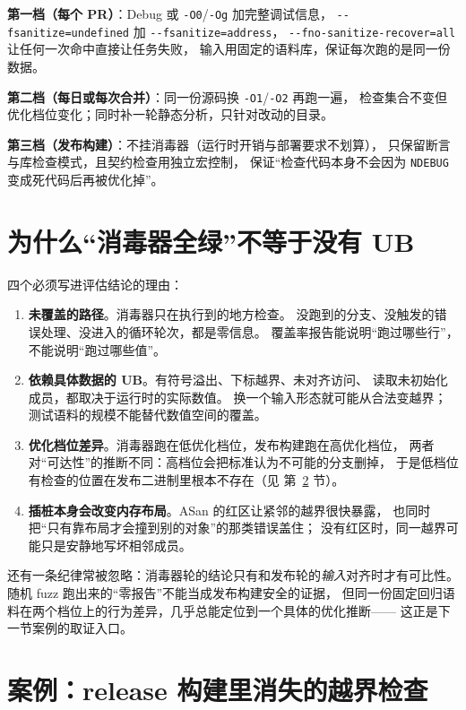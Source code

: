 \documentclass[12pt,a4paper,fontset=fandol]{ctexbook}
\newcommand{\Tp}[1]{\texttt{#1}}
\newcommand{\Opt}[1]{\texttt{-\/-#1}}
\begin{document}
\begin{guideline}[title={分档策略：按档位决定检查集合}]
\textbf{第一档（每个 PR）}：Debug 或 \Tp{-O0}/\Tp{-Og} 加完整调试信息，
\Opt{fsanitize=undefined} 加 \Opt{fsanitize=address}，
\Opt{fno-sanitize-recover=all} 让任何一次命中直接让任务失败，
输入用固定的语料库，保证每次跑的是同一份数据。

\textbf{第二档（每日或每次合并）}：同一份源码换 \Tp{-O1}/\Tp{-O2} 再跑一遍，
检查集合不变但优化档位变化；同时补一轮静态分析，只针对改动的目录。

\textbf{第三档（发布构建）}：不挂消毒器（运行时开销与部署要求不划算），
只保留断言与库检查模式，且契约检查用独立宏控制，
保证“检查代码本身不会因为 \Tp{NDEBUG} 变成死代码后再被优化掉”。
\end{guideline}

\section{为什么“消毒器全绿”不等于没有 UB}\label{sec:ub03-green}

四个必须写进评估结论的理由：

\begin{enumerate}
\item \textbf{未覆盖的路径}。消毒器只在执行到的地方检查。
      没跑到的分支、没触发的错误处理、没进入的循环轮次，都是零信息。
      覆盖率报告能说明“跑过哪些行”，不能说明“跑过哪些值”。
\item \textbf{依赖具体数据的 UB}。有符号溢出、下标越界、未对齐访问、
      读取未初始化成员，都取决于运行时的实际数值。
      换一个输入形态就可能从合法变越界；测试语料的规模不能替代数值空间的覆盖。
\item \textbf{优化档位差异}。消毒器跑在低优化档位，发布构建跑在高优化档位，
      两者对“可达性”的推断不同：高档位会把标准认为不可能的分支删掉，
      于是低档位有检查的位置在发布二进制里根本不存在（见 第~\ref{sec:ub03-case-checkdrop} 节）。
\item \textbf{插桩本身会改变内存布局}。ASan 的红区让紧邻的越界很快暴露，
      也同时把“只有靠布局才会撞到别的对象”的那类错误盖住；
      没有红区时，同一越界可能只是安静地写坏相邻成员。
\end{enumerate}

还有一条纪律常被忽略：消毒器轮的结论只有和发布轮的\emph{输入}对齐时才有可比性。
随机 fuzz 跑出来的“零报告”不能当成发布构建安全的证据，
但同一份固定回归语料在两个档位上的行为差异，几乎总能定位到一个具体的优化推断——
这正是下一节案例的取证入口。

\section{案例：release 构建里消失的越界检查}\label{sec:ub03-case-checkdrop}
\end{document}
